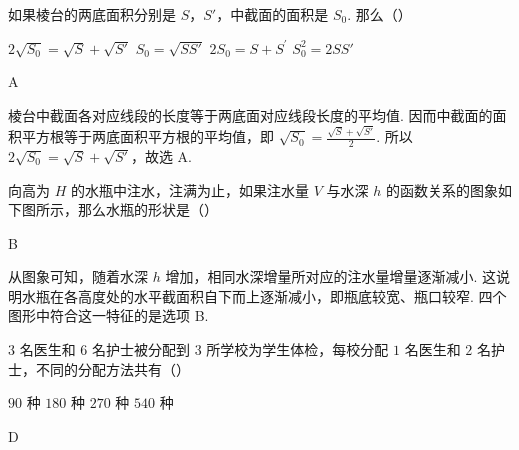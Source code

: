 \documentclass[UTF8,a4paper,oneside,11pt]{ctexbook}
\begin{document}
\begin{problem}
如果棱台的两底面积分别是 \(S\)，\(S'\)，中截面的面积是 \(S_0\). 那么（\quad）

\choices
    {\(2\sqrt{S_0} = \sqrt{S} +\sqrt{S'}\)}
    {\(S_0 = \sqrt{SS'}\)}
    {\(2S_{0} = S + S^{\prime}\)}
    {\(S_0^2 = 2SS'\)}
\end{problem}

\begin{answer}
A
\end{answer}

\begin{solution}
棱台中截面各对应线段的长度等于两底面对应线段长度的平均值. 因而中截面的面积平方根等于两底面积平方根的平均值，即
\(\sqrt{S_{0}}=\frac{\sqrt{S}+\sqrt{S'}}{2}\). 所以
\(2\sqrt{S_{0}}=\sqrt{S}+\sqrt{S'}\)，故选 A.
\end{solution}

\begin{problem}
向高为 \(H\) 的水瓶中注水，注满为止，如果注水量 \(V\) 与水深 \(h\) 的函数关系的图象如下图所示，那么水瓶的形状是（\quad）

\choices
    {}
    {}
    {}
    {}
\end{problem}

\begin{answer}
B
\end{answer}

\begin{solution}
从图象可知，随着水深 \(h\) 增加，相同水深增量所对应的注水量增量逐渐减小. 这说明水瓶在各高度处的水平截面积自下而上逐渐减小，即瓶底较宽、瓶口较窄. 四个图形中符合这一特征的是选项 B.
\end{solution}

\begin{problem}
\(3\) 名医生和 \(6\) 名护士被分配到 \(3\) 所学校为学生体检，每校分配 \(1\) 名医生和 \(2\) 名护士，不同的分配方法共有（\quad）

\choices
    {\(90\) 种}
    {\(180\) 种}
    {\(270\) 种}
    {\(540\) 种}
\end{problem}

\begin{answer}
D
\end{answer}
\end{document}
